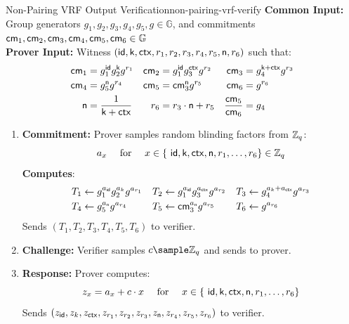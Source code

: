

\newpage
\begin{protocol}{Non-Pairing VRF Output Verification}{non-pairing-vrf-verify}\label{pok-non-pairing-vrf}
\textbf{Common Input:} Group generators $g_1, g_2, g_3, g_4, g_5, g \in \mathbb{G}$, and commitments $\mathsf{cm}_1, \mathsf{cm}_2, \mathsf{cm}_3, \mathsf{cm}_4, \mathsf{cm}_5, \mathsf{cm}_6 \in \mathbb{G}$\\
\textbf{Prover Input:} Witness $(\mathsf{id}, \mathsf{k}, \mathsf{ctx}, r_1, r_2, r_3, r_4, r_5, \textsf{n}, r_6)$ such that:
    \begin{align*}
        \mathsf{cm}_1 &= g_1^{\mathsf{id}} g_2^{\mathsf{k}} g^{r_1}     &    \mathsf{cm}_2 &= g_1^{\mathsf{id}} g_3^{\mathsf{ctx}} g^{r_2}  &   \mathsf{cm}_3 &= g_4^{\mathsf{k} + \mathsf{ctx}} g^{r_3}\\
        \mathsf{cm}_4 &= g_5^{\textsf{n}} g^{r_4}   &   \mathsf{cm}_5 &= \mathsf{cm}_3^{\textsf{n}} g^{r_5}     &   \mathsf{cm}_6 &= g^{r_6} \\
        \textsf{n} &= \frac{1}{\mathsf{k} + \mathsf{ctx}}   &   r_6 &= r_3 \cdot \textsf{n} + r_5    &   \frac{\mathsf{cm}_5}{\mathsf{cm}_6} &= g_4 \\
    \end{align*}

\begin{enumerate}
    \item \textbf{Commitment:} Prover samples random blinding factors from $\mathbb{Z}_q$:
    \[
        a_x \quad \text{ for } \quad x \in \{\ \mathsf{id}, \mathsf{k}, \mathsf{ctx}, \textsf{n}, r_1, \ldots,r_6\} \in \mathbb{Z}_q
    \]
    \textbf{Computes}:
    \begin{align*}
        T_1 &\gets g_1^{a_{\mathsf{id}}} g_2^{a_k} g^{a_{r_1}}  &   T_2 &\gets g_1^{a_{\mathsf{id}}} g_3^{a_{\mathsf{ctx}}} g^{a_{r_2}}     &   T_3 &\gets g_4^{a_k + a_{\mathsf{ctx}}} g^{a_{r_3}} \\
        T_4 &\gets g_5^{a_{\textsf{n}}} g^{a_{r_4}}   &   T_5 &\gets \mathsf{cm}_3^{a_{\textsf{n}}} g^{a_{r_5}}     &   T_6 &\gets g^{a_{r_6}}
    \end{align*}
    Sends $(T_1, T_2, T_3, T_4, T_5, T_6)$ to verifier.
    
    \item \textbf{Challenge:} Verifier samples $c \sample \mathbb{Z}_q$ and sends to prover.
    
    \item \textbf{Response:} Prover computes:
    \[
    z_x = a_x + c \cdot x \quad \text{ for } \quad x \in \{\ \mathsf{id}, \mathsf{k}, \mathsf{ctx}, \textsf{n}, r_1, \ldots,r_6\} 
    \]
    Sends $(z_{\mathsf{id}}, z_k, z_{\mathsf{ctx}}, z_{r_1}, z_{r_2}, z_{r_3}, z_{\textsf{n}}, z_{r_4}, z_{r_5}, z_{r_6})$ to verifier.
    

\end{enumerate}
\end{protocol}
